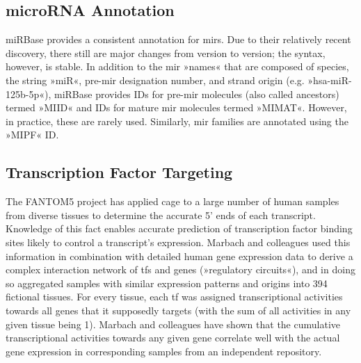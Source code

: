 \subsection{microRNA Annotation}
miRBase provides a consistent annotation for \acp{mir}. Due to their relatively recent discovery, there still are major changes from version to version; the syntax, however, is stable. In addition to the \ac{mir} »names« that are composed of species, the string »miR«, pre-\ac{mir} designation number, and strand origin (e.g. »hsa-miR-125b-5p«), miRBase provides IDs for pre-\ac{mir} molecules (also called ancestors) termed »MIID« and IDs for mature \ac{mir} molecules termed »MIMAT«. However, in practice, these are rarely used. Similarly, \ac{mir} families are annotated using the »MIPF« ID.

\subsection{Transcription Factor Targeting} \label{sec:database:tf}
The FANTOM5 project has applied \ac{cage} to a large number of human samples from diverse tissues to determine the accurate 5' ends of each transcript.\cite{Hon2017} Knowledge of this fact enables accurate prediction of transcription factor binding sites likely to control a transcript's expression. Marbach and colleagues used this information in combination with detailed human gene expression data to derive a complex interaction network of \acp{tf} and genes (»regulatory circuits«), and in doing so aggregated samples with similar expression patterns and origins into 394 fictional tissues.\cite{Marbach2016} For every tissue, each \ac{tf} was assigned transcriptional activities towards all genes that it supposedly targets (with the sum of all activities in any given tissue being \num{1}). Marbach and colleagues have shown that the cumulative transcriptional activities towards any given gene correlate well with the actual gene expression in corresponding samples from an independent repository.

